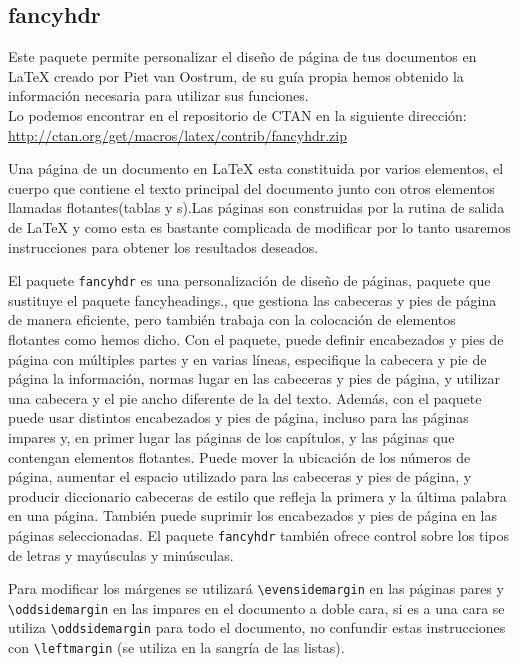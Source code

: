 	
	
	
	\subsection{fancyhdr}\label{ssec:fancyhdr}
  	
	 Este paquete permite personalizar el diseño de página de tus documentos en \LaTeX{} creado por Piet van Oostrum, de su guía propia \cite{guiafancy} hemos obtenido la información necesaria para utilizar sus funciones.\\

	Lo podemos encontrar en el repositorio de CTAN en la siguiente dirección:\\
	\url{http://ctan.org/get/macros/latex/contrib/fancyhdr.zip}	

	Una página de un documento en \LaTeX{} esta constituida por varios elementos, el cuerpo que contiene el texto principal del documento junto con otros elementos llamadas flotantes(tablas y 
s).Las páginas son construidas por la rutina de salida de \LaTeX{} y como esta es bastante complicada de modificar por lo tanto usaremos instrucciones para obtener los resultados deseados.

	El paquete \verb|fancyhdr| es una personalización de diseño de páginas, paquete que sustituye el paquete fancyheadings.,  que gestiona las cabeceras y pies de página de manera eficiente, pero también trabaja con la colocación de elementos flotantes como hemos dicho. Con el paquete, puede definir encabezados y pies de página con múltiples partes y en varias líneas, especifique la cabecera y pie de página la información, normas lugar en las cabeceras y pies de página, y utilizar una cabecera y el pie ancho diferente de la del texto. Además, con el paquete puede usar distintos encabezados y pies de página, incluso para las páginas impares y, en primer lugar las páginas de los capítulos, y las páginas que contengan elementos flotantes. Puede mover la ubicación de los números de página, aumentar el espacio utilizado para las cabeceras y pies de página, y producir diccionario cabeceras de estilo que refleja la primera y la última palabra en una página. También puede suprimir los encabezados y pies de página en las páginas seleccionadas. El paquete \verb|fancyhdr| también ofrece control sobre los tipos de letras y mayúsculas y minúsculas.

	Para modificar los márgenes se utilizará \verb+\evensidemargin+ en las páginas pares y \verb+\oddsidemargin+ en las impares en el documento a doble cara, si es a una cara se utiliza \verb+\oddsidemargin+ para todo el documento, no confundir estas instrucciones con \verb+\leftmargin+ (se utiliza en la sangría de las listas).

